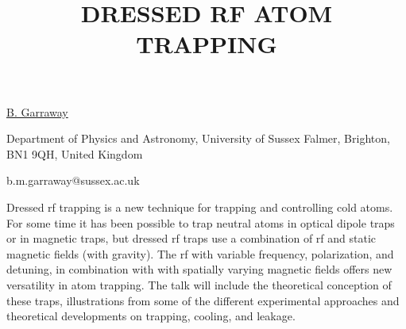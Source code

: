 \title{DRESSED RF ATOM TRAPPING}

\underline{B. Garraway} 

{\normalsize{\vspace{-4mm}
Department of Physics and Astronomy, University of Sussex Falmer,
Brighton, BN1 9QH, United Kingdom

\email b.m.garraway@sussex.ac.uk}}

Dressed rf trapping is a new technique for
trapping and controlling cold atoms. For some time it
has been possible to trap neutral atoms in optical
dipole traps or in magnetic traps, but dressed rf traps
use a combination of rf and static magnetic fields
(with gravity). The rf with variable frequency,
polarization, and detuning, in combination with with
spatially varying magnetic fields offers new
versatility in atom trapping.
The talk will include the theoretical conception of
these traps, illustrations from some of the different
experimental approaches and theoretical developments on
trapping, cooling, and leakage.

\vspace{\baselineskip}
